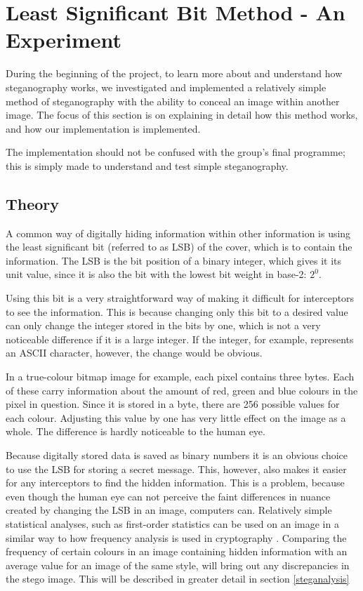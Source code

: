 \section{Least Significant Bit Method - An Experiment}
During the beginning of the project, to learn more about and understand how steganography works, we investigated and implemented a relatively simple method of steganography with the ability to conceal an image within another image.
The focus of this section is on explaining in detail how this method works, and how our implementation is implemented.

The implementation should not be confused with the group's final programme; this is simply made to understand and test simple steganography.

\subsection{Theory}
A common way of digitally hiding information within other information is using the least significant bit (referred to as LSB) of the cover, which is to contain the information.
The LSB is the bit position of a binary integer, which gives it its unit value, since it is also the bit with the lowest bit weight in base-2: $2^0$.

Using this bit is a very straightforward way of making it difficult for interceptors to see the information.
This is because changing only this bit to a desired value can only change the integer stored in the bits by one, which is not a very noticeable difference if it is a large integer.
If the integer, for example, represents an ASCII character, however, the change would be obvious.

In a true-colour bitmap image for example, each pixel contains three bytes.
Each of these carry information about the amount of red, green and blue colours in the pixel in question.
Since it is stored in a byte, there are 256 possible values for each colour.
Adjusting this value by one has very little effect on the image as a whole.
The difference is hardly noticeable to the human eye.

Because digitally stored data is saved as binary numbers it is an obvious choice to use the LSB for storing a secret message.
This, however, also makes it easier for any interceptors to find the hidden information.
This is a problem, because even though the human eye can not perceive the faint differences in nuance created by changing the LSB in an image, computers can.
Relatively simple statistical analyses, such as first-order statistics can be used on an image in a similar way to how frequency analysis is used in cryptography \citep{Hetzl2005}.
Comparing the frequency of certain colours in an image containing hidden information with an average value for an image of the same style, will bring out any discrepancies in the stego image.
This will be described in greater detail in section \ref{steganalysis}

